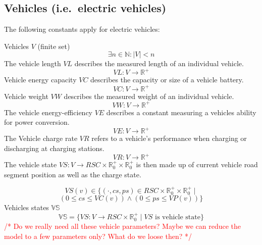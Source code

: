 \documentclass[conference]{IEEEtran}
\newcommand{\todo}[1]{\textcolor{red}{/* #1 */}}
\begin{document}
%	
%	
	\subsection{Vehicles (i.e.\ electric vehicles)}
	\label{vehicles}
	The following constants apply for electric vehicles: 
	
	Vehicles $V$ (finite set)
	\[
		\exists n \in \mathbb{N} : |V| < n
	\]
	The vehicle length $VL$ describes the measured length of an individual vehicle. 
	\[
		VL : V \rightarrow \mathbb{R}^+
	\]
	Vehicle energy capacity $VC$ describes the capacity or size of a vehicle battery.
	\[
		VC : V \rightarrow \mathbb{R}^+
	\]
	Vehicle weight $VW$ describes the measured weight of an individual vehicle.
	\[
		VW : V \rightarrow \mathbb{R}^+
	\]
	The vehicle energy-efficiency $VE$ describes a constant measuring a vehicles ability for power conversion.
		\[
		VE : V \rightarrow \mathbb{R}^+
	\]
	The Vehicle charge rate $VR$ refers to a vehicle's performance when charging or discharging at charging stations.
		\[
		VR : V \rightarrow \mathbb{R}^+
	\]
	The vehicle state $VS : V \rightarrow RSC \times \mathbb{R}_0^+ \times \mathbb{R}_0^+$ is then made up of current vehicle road segment position as well as the charge state. 
	
	\[
		VS(v) \in \{ (\cdot, cs, ps) \in RSC \times \mathbb{R}_0^+ \times \mathbb{R}_0^+ \mid
	\]
	\[
		(0 \leq cs \leq VC(v)) \wedge (0 \leq ps \leq VP(v)) \}
	\]
	Vehicles states $\mathbb{VS}$ 
	\[
		\mathbb{VS} = \{VS : V \rightarrow RSC \times \mathbb{R}_0^+ \mid VS \text{ is vehicle state}\}
	\]
	\todo{Do we really need all these vehicle parameters? Maybe we can reduce the model to a few parameters only? What do we loose then?}
	
\end{document}

